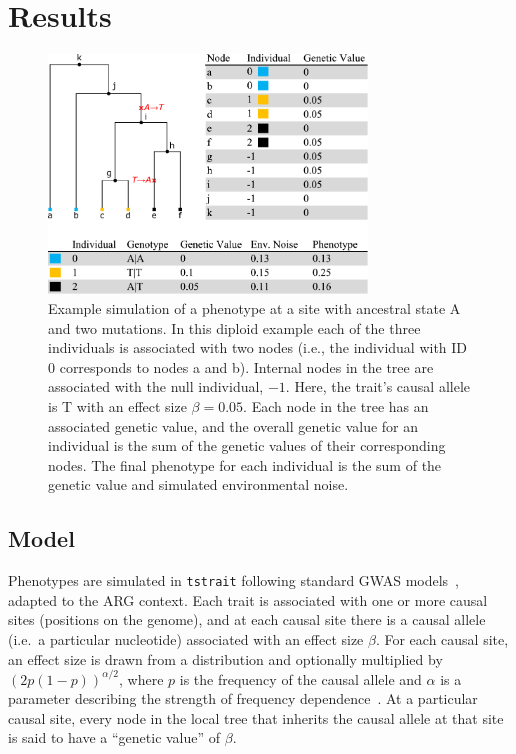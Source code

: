 \documentclass[unnumsec,webpdf,modern,large,namedate]{oup-authoring-template}%
\begin{document}
\section{Results}
\begin{figure}[t]%
\centering
\includegraphics[width=240pt]{figures/tree-illustration.pdf}
\caption{Example simulation of a phenotype at a site with ancestral state A and
two mutations. In this diploid example each of the three individuals
is associated with two nodes (i.e., the individual with ID 0 corresponds
to nodes \textsf{a} and \textsf{b}). Internal nodes in the tree are associated
with the null individual, $-1$. Here, the trait's causal allele is T
with an effect size $\beta=0.05$. Each node in the tree has an associated
genetic value, and the overall genetic value for an individual is the
sum of the genetic values of their corresponding nodes.
The final phenotype
for each individual is the sum of the genetic value and
simulated environmental noise.
\label{fig:tree-illustration}}
\end{figure}

\subsection{Model}
Phenotypes are simulated in \texttt{tstrait} following standard
GWAS models~\citep{uffelmann2021}, adapted to the ARG context.
Each trait is associated with one or more causal sites
(positions on the genome), and at each causal site there is a causal allele
(i.e.\ a particular nucleotide) associated with an effect size $\beta$.
For each causal site, an effect size is drawn from a distribution
and optionally multiplied by $\left(2p(1-p)\right)^{\alpha/2}$,
where $p$ is the frequency of the causal allele and $\alpha$
is a parameter describing the strength of
frequency dependence~\citep{speed2012}.
At a particular causal site, every node in the local tree that inherits
the causal allele at that site is said to have a ``genetic value'' of $\beta$.
\end{document}
